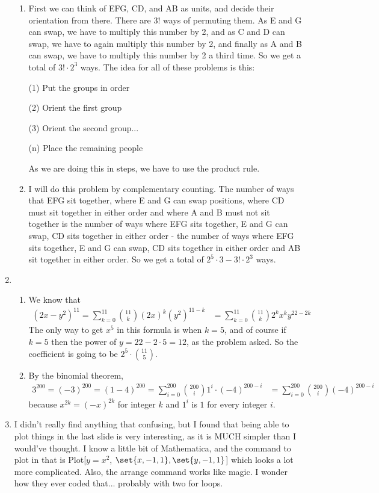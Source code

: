 \documentclass[12pt]{article}
\theoremstyle{definition}
\theoremstyle{remark}
\begin{document}
\begin{enumerate}[leftmargin=\labelsep]
\begin{enumerate}
			\item First we can think of EFG, CD, and AB as units, and decide their orientation from there. There are $3!$ ways of permuting them. As E and G can swap, we have to multiply this number by 2, and as C and D can swap, we have to again multiply this number by 2, and finally as A and B can swap, we have to multiply this number by 2 a third time. So we get a total of $3! \cdot 2^3$ ways. The idea for all of these problems is this:
			
			(1) Put the groups in order
			
			(2) Orient the first group
			
			(3) Orient the second group...
			
			(n) Place the remaining people
			
			As we are doing this in steps, we have to use the product rule.
			
			\item I will do this problem by complementary counting. The number of ways that EFG sit together, where E and G can swap positions, where CD must sit together in either order and where A and B must not sit together is the number of ways where EFG sits together, E and G can swap, CD sits together in either order - the number of ways where EFG sits together, E and G can swap, CD sits together in either order and AB sit together in either order. So we get a total of $2^5 \cdot 3 - 3! \cdot 2^3$ ways.
		\end{enumerate}
		
		\newpage
		\item \begin{enumerate}
			\item We know that 
			\begin{align*}
				(2x-y^2)^{11} = \sum_{k=0}^{11} {11 \choose k} (2x)^k (y^2)^{11-k} &= \sum_{k=0}^{11} {11 \choose k} 2^k x^k y^{22-2k}
			\end{align*}
			The only way to get $x^5$ in this formula is when $k = 5$, and of course if $k = 5$ then the power of $y = 22 - 2 \cdot 5 = 12$, as the problem asked. So the coefficient is going to be $2^5 \cdot {11 \choose 5}$.
			\item By the binomial theorem,
			\begin{align*}
				3^{200} = (-3)^{200} = (1-4)^{200} = \sum_{i=0}^{200} {200 \choose i} 1^i \cdot (-4)^{200 - i} &= \sum_{i=0}^{200} {200 \choose i} (-4)^{200 - i}
			\end{align*}
			because $x^{2k} = (-x)^{2k}$ for integer $k$ and $1^i$ is $1$ for every integer $i$.
		\end{enumerate}
	
		\newpage
		\item I didn't really find anything that confusing, but I found that being able to plot things in the last slide is very interesting, as it is MUCH simpler than I would've thought. I know a little bit of Mathematica, and the command to plot in that is Plot[$y=x^2$, $\set{x, -1, 1}, \set{y, -1, 1}$] which looks a lot more complicated. Also, the arrange command works like magic. I wonder how they ever coded that... probably with two for loops.
	\end{enumerate}
\end{document}
